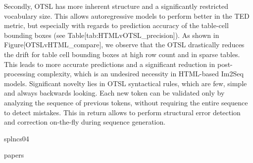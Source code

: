 \documentclass[11pt,a4paper]{article}
\begin{document}
Secondly, OTSL has more inherent structure and a significantly restricted vocabulary size. This allows autoregressive models to perform better in the TED metric, but especially with regards to prediction accuracy of the table-cell bounding boxes (see Table[tab:HTMLvOTSL\_precision]). As shown in Figure[OTSLvHTML\_compare], we observe that the OTSL drastically reduces the drift for table cell bounding boxes at high row count and in sparse tables. This leads to more accurate predictions and a significant reduction in post-processing complexity, which is an undesired necessity in HTML-based Im2Seq models.
Significant novelty lies in OTSL syntactical rules, which are few, simple and always backwards looking. Each new token can be validated only by analyzing the sequence of previous tokens, without requiring the entire sequence to detect mistakes. This in return allows to perform structural error detection and correction on-the-fly during sequence generation.

splncs04

papers
\end{document}

